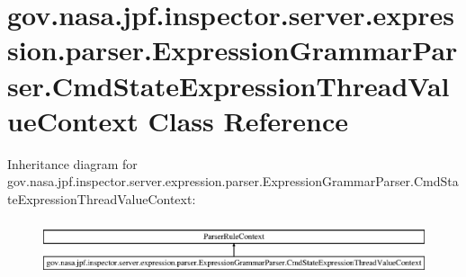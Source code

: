 \hypertarget{classgov_1_1nasa_1_1jpf_1_1inspector_1_1server_1_1expression_1_1parser_1_1_expression_grammar_pa5a19a4a13564890289bc65b6a0372f78}{}\section{gov.\+nasa.\+jpf.\+inspector.\+server.\+expression.\+parser.\+Expression\+Grammar\+Parser.\+Cmd\+State\+Expression\+Thread\+Value\+Context Class Reference}
\label{classgov_1_1nasa_1_1jpf_1_1inspector_1_1server_1_1expression_1_1parser_1_1_expression_grammar_pa5a19a4a13564890289bc65b6a0372f78}
Inheritance diagram for gov.\+nasa.\+jpf.\+inspector.\+server.\+expression.\+parser.\+Expression\+Grammar\+Parser.\+Cmd\+State\+Expression\+Thread\+Value\+Context\+:\begin{figure}[H]
\begin{center}
\leavevmode
\includegraphics[height=1.642229cm]{classgov_1_1nasa_1_1jpf_1_1inspector_1_1server_1_1expression_1_1parser_1_1_expression_grammar_pa5a19a4a13564890289bc65b6a0372f78}
\end{center}
\end{figure}
